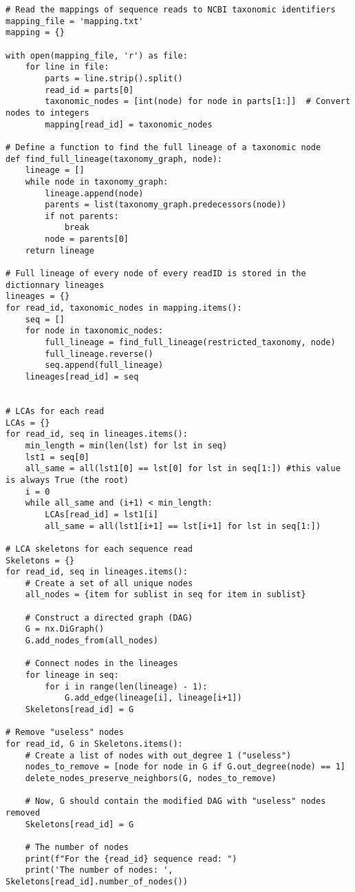 \documentclass[12 pt,a4paper]{article}
\begin{document}
\begin{verbatim}
# Read the mappings of sequence reads to NCBI taxonomic identifiers
mapping_file = 'mapping.txt'
mapping = {}

with open(mapping_file, 'r') as file:
    for line in file:
        parts = line.strip().split()
        read_id = parts[0]
        taxonomic_nodes = [int(node) for node in parts[1:]]  # Convert nodes to integers
        mapping[read_id] = taxonomic_nodes

# Define a function to find the full lineage of a taxonomic node
def find_full_lineage(taxonomy_graph, node):
    lineage = []
    while node in taxonomy_graph:
        lineage.append(node)
        parents = list(taxonomy_graph.predecessors(node))
        if not parents:
            break
        node = parents[0]
    return lineage

# Full lineage of every node of every readID is stored in the dictionnary lineages
lineages = {}
for read_id, taxonomic_nodes in mapping.items():
    seq = []
    for node in taxonomic_nodes:
        full_lineage = find_full_lineage(restricted_taxonomy, node)
        full_lineage.reverse()
        seq.append(full_lineage)
    lineages[read_id] = seq


# LCAs for each read
LCAs = {}
for read_id, seq in lineages.items():
    min_length = min(len(lst) for lst in seq) 
    lst1 = seq[0]
    all_same = all(lst1[0] == lst[0] for lst in seq[1:]) #this value is always True (the root)
    i = 0
    while all_same and (i+1) < min_length:
        LCAs[read_id] = lst1[i]
        all_same = all(lst1[i+1] == lst[i+1] for lst in seq[1:])

# LCA skeletons for each sequence read
Skeletons = {}
for read_id, seq in lineages.items():
    # Create a set of all unique nodes
    all_nodes = {item for sublist in seq for item in sublist}

    # Construct a directed graph (DAG)
    G = nx.DiGraph()
    G.add_nodes_from(all_nodes)

    # Connect nodes in the lineages
    for lineage in seq:
        for i in range(len(lineage) - 1):
            G.add_edge(lineage[i], lineage[i+1])
    Skeletons[read_id] = G

# Remove "useless" nodes
for read_id, G in Skeletons.items():
    # Create a list of nodes with out_degree 1 ("useless")
    nodes_to_remove = [node for node in G if G.out_degree(node) == 1]
    delete_nodes_preserve_neighbors(G, nodes_to_remove)
    
    # Now, G should contain the modified DAG with "useless" nodes removed
    Skeletons[read_id] = G
    
    # The number of nodes
    print(f"For the {read_id} sequence read: ")
    print('The number of nodes: ', Skeletons[read_id].number_of_nodes())
\end{verbatim}
\end{document}
